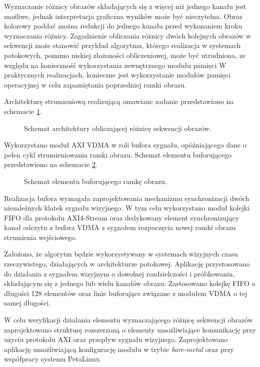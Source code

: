 Wyznaczanie różnicy obrazów składających się z więcej niż jednego kanału jest możliwe, jednak interpretacja graficzna wyników może być nieczytelna. Obraz kolorowy poddać można redukcji do jednego kanału przed wykonaniem kroku wyznaczania różnicy.
Zagadnienie obliczania różnicy dwóch kolejnych obrazów w sekwencji może stanowić przykład algorytmu, którego realizacja w systemach potokowych, pomimo niskiej złożoności obliczeniowej, może być utrudniona, ze względu na konieczność wykorzystania zewnętrznego modułu pamięci
W praktycznych realizacjach, konieczne jest wykorzystanie modułów pamięci operacyjnej w celu zapamiętania poprzedniej ramki obrazu. 

Architekturę strumieniową realizującą omawiane zadanie przedstawiono na schemacie \ref{fig:frame-difference}.


\begin{figure}[h]
	\centering
	\def\svgwidth{\textwidth}
	
	\caption{Schemat architektury obliczającej różnicę sekwencji obrazów.}
	\label{fig:frame-difference}
\end{figure}

Wykorzystano moduł AXI VDMA w roli bufora sygnału, opóźniającego dane o pełen cykl strumieniowania ramki obrazu. 
Schemat elementu buforującego przedstawiono na schemacie \ref{fig:vdma-buffer}.


\begin{figure}[h]
	\centering
	\def\svgwidth{\textwidth}
	
	\caption{Schemat elementu buforującego ramkę obrazu.}
	\label{fig:vdma-buffer}
\end{figure}

Realizacja bufora wymagała zaprojektowania mechanizmu synchronizacji dwóch niezależnych klatek sygnału wizyjnego. 
W tym celu wykorzystano moduł kolejki FIFO dla protokołu AXI4-Stream oraz dedykowany element synchronizujący kanał odczytu z bufora VDMA z sygnałem rozpoczęcia nowej ramki obrazu strumienia wejściowego. 

Założono, że algorytm będzie wykorzystywany w systemach wizyjnych czasu rzeczywistego, działających w architekturze potokowej. 
Aplikację przystosowano do działania z sygnałem wizyjnym o dowolnej rozdzielczości i próbkowaniu, składającym się z jednego lub wielu kanałów obrazu.
Zastosowano kolejkę FIFO o długości 128 elementów oraz linie buforujące związane z modułem VDMA o tej samej długości.

W celu weryfikacji działania elementu wyznaczającego różnicę sekwencji obrazów zaprojektowano strukturę rozszerzoną o elementy umożliwiające komunikację przy użyciu protokołu AXI oraz przepływ sygnału wizyjnego. 
Zaprojektowano aplikację umożliwiającą konfigurację modułu w trybie \textit{bare-metal} oraz przy współpracy systemu PetaLinux.

